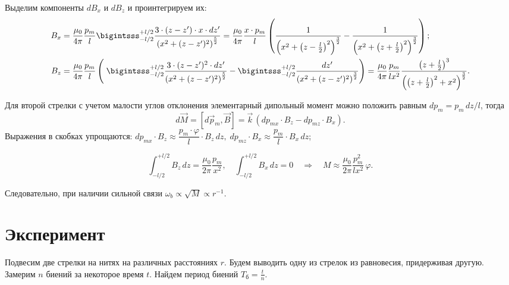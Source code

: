\documentclass{letask}
\begin{document}
Выделим компоненты $dB_x$ и $dB_z$ и проинтегрируем их:
\begin{equation*}
\begin{split}
B_x &= \dfrac{\mu_0}{4 \pi} \dfrac{p_m}{l} \bigintsss_{-l/2}^{+l/2}
		\dfrac{3 \cdot (z-z') \cdot x \cdot dz'}
		{\left(x^2 + (z-z')^2 \right)^{\frac{5}{2}}}
	= \dfrac{\mu_0}{4 \pi}
	\dfrac{x \cdot p_m}{l}
	\left(
		\frac{1}{\left(x^2 + \left(z-\frac{l}{2}\right)^2 \right)^{\frac{3}{2}}} -
		\frac{1}{\left(x^2 + \left(z+\frac{l}{2}\right)^2 \right)^{\frac{3}{2}}}
	\right);
\\
B_z &= \dfrac{\mu_0}{4 \pi} \dfrac{p_m}{l}
\left( \;
	\bigintsss_{-l/2}^{+l/2}
	\dfrac{3 \cdot (z-z')^2 \cdot dz'}
	{\left(x^2 + (z-z')^2 \right)^{\frac{5}{2}}} -
	 \bigintsss_{-l/2}^{+l/2}
	\dfrac{dz'}
	{\left(x^2 + (z-z')^2 \right)^{\frac{3}{2}}}
\right) = \dfrac{\mu_0}{4 \pi} \dfrac{p_m}{lx^2}
	\dfrac{\left(z+\frac{l}{2}\right)^3}
	{\left(\left(z+\frac{l}{2}\right)^2 + x^2 \right)^{\frac{3}{2}}}.
\end{split}
\end{equation*}

Для второй стрелки с учетом малости углов отклонения элементарный дипольный момент можно положить равным $dp_m = p_m \,dz/l$, тогда
\begin{equation}
d \vec{M} = \left[ d \vec{p}_m, \vec{B} \right] = \vec{k} \, (dp_{mx} \cdot B_z - dp_{mz} \cdot B_x).
\end{equation}
Выражения в скобках упрощаются: $ dp_{mx} \cdot B_z \approx \dfrac{p_m \cdot \varphi}{l} \cdot B_z \,dz, \; dp_{mz} \cdot B_x \approx \dfrac{p_m}{l} \cdot B_x \,dz $;

$$ \int_{-l/2}^{+l/2} B_z \,dz = \dfrac{\mu_0}{2\pi} \dfrac{p_m}{x^2}, \quad
\int_{-l/2}^{+l/2} B_x \,dz = 0 \quad \Rightarrow \quad
M \approx \dfrac{\mu_0}{2\pi} \dfrac{p_m^2}{lx^2} \,\varphi. $$

Следовательно, при наличии сильной связи $\omega_b \propto \sqrt{M} \propto r^{-1}$.


\clearpage
\section{Эксперимент}
Подвесим две стрелки на нитях на различных расстояниях $r$. Будем выводить одну из стрелок из равновесия, придерживая другую. Замерим $n$ биений за некоторое время $t$. Найдем период биений $T_\text{б} = \frac{t}{n}$.
\end{document}
